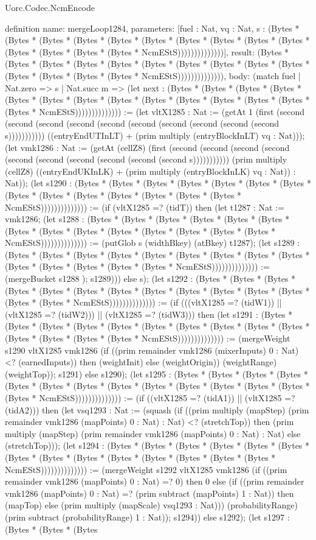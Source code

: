 \begin{lexlean}{Uorc.Codec.NcmEncode}
\begin{semanticmodule}
definition{
  name: mergeLoop1284,
  parameters: [fuel : Nat, vq : Nat, s : (Bytes * (Bytes * (Bytes * (Bytes * (Bytes * (Bytes * (Bytes * (Bytes * (Bytes * (Bytes * (Bytes * (Bytes * (Bytes * (Bytes * NcmEStS))))))))))))))],
  result: (Bytes * (Bytes * (Bytes * (Bytes * (Bytes * (Bytes * (Bytes * (Bytes * (Bytes * (Bytes * (Bytes * (Bytes * (Bytes * (Bytes * NcmEStS)))))))))))))),
  body: (match fuel
    | Nat.zero => s
    | Nat.succ m => (let next : (Bytes * (Bytes * (Bytes * (Bytes * (Bytes * (Bytes * (Bytes * (Bytes * (Bytes * (Bytes * (Bytes * (Bytes * (Bytes * (Bytes * NcmEStS)))))))))))))) := (let vltX1285 : Nat := (getAt 1 (first (second (second (second (second (second (second (second (second (second (second s))))))))))) ((entryEndUTInLT) + (prim multiply (entryBlockInLT) vq : Nat))); (let vmk1286 : Nat := (getAt (cellZ8) (first (second (second (second (second (second (second (second (second (second (second s))))))))))) (prim multiply (cellZ8) ((entryEndUKInLK) + (prim multiply (entryBlockInLK) vq : Nat)) : Nat)); (let s1290 : (Bytes * (Bytes * (Bytes * (Bytes * (Bytes * (Bytes * (Bytes * (Bytes * (Bytes * (Bytes * (Bytes * (Bytes * (Bytes * (Bytes * NcmEStS)))))))))))))) := (if (vltX1285 =? (tidT)) then (let t1287 : Nat := vmk1286; (let s1288 : (Bytes * (Bytes * (Bytes * (Bytes * (Bytes * (Bytes * (Bytes * (Bytes * (Bytes * (Bytes * (Bytes * (Bytes * (Bytes * (Bytes * NcmEStS)))))))))))))) := (putGlob s (widthBkey) (atBkey) t1287); (let s1289 : (Bytes * (Bytes * (Bytes * (Bytes * (Bytes * (Bytes * (Bytes * (Bytes * (Bytes * (Bytes * (Bytes * (Bytes * (Bytes * (Bytes * NcmEStS)))))))))))))) := (mergeBucket s1288 ); s1289))) else s); (let s1292 : (Bytes * (Bytes * (Bytes * (Bytes * (Bytes * (Bytes * (Bytes * (Bytes * (Bytes * (Bytes * (Bytes * (Bytes * (Bytes * (Bytes * NcmEStS)))))))))))))) := (if (((vltX1285 =? (tidW1)) || (vltX1285 =? (tidW2))) || (vltX1285 =? (tidW3))) then (let s1291 : (Bytes * (Bytes * (Bytes * (Bytes * (Bytes * (Bytes * (Bytes * (Bytes * (Bytes * (Bytes * (Bytes * (Bytes * (Bytes * (Bytes * NcmEStS)))))))))))))) := (mergeWeight s1290 vltX1285 vmk1286 (if ((prim remainder vmk1286 (mixerInputs) 0 : Nat) <? (earnedInputs)) then (weightInit) else (weightOrigin)) (weightRange) (weightTop)); s1291) else s1290); (let s1295 : (Bytes * (Bytes * (Bytes * (Bytes * (Bytes * (Bytes * (Bytes * (Bytes * (Bytes * (Bytes * (Bytes * (Bytes * (Bytes * (Bytes * NcmEStS)))))))))))))) := (if ((vltX1285 =? (tidA1)) || (vltX1285 =? (tidA2))) then (let vsq1293 : Nat := (squash (if ((prim multiply (mapStep) (prim remainder vmk1286 (mapPoints) 0 : Nat) : Nat) <? (stretchTop)) then (prim multiply (mapStep) (prim remainder vmk1286 (mapPoints) 0 : Nat) : Nat) else (stretchTop))); (let s1294 : (Bytes * (Bytes * (Bytes * (Bytes * (Bytes * (Bytes * (Bytes * (Bytes * (Bytes * (Bytes * (Bytes * (Bytes * (Bytes * (Bytes * NcmEStS)))))))))))))) := (mergeWeight s1292 vltX1285 vmk1286 (if ((prim remainder vmk1286 (mapPoints) 0 : Nat) =? 0) then 0 else (if ((prim remainder vmk1286 (mapPoints) 0 : Nat) =? (prim subtract (mapPoints) 1 : Nat)) then (mapTop) else (prim multiply (mapScale) vsq1293 : Nat))) (probabilityRange) (prim subtract (probabilityRange) 1 : Nat)); s1294)) else s1292); (let s1297 : (Bytes * (Bytes * (Bytes }
\end{semanticmodule}
\end{lexlean}

